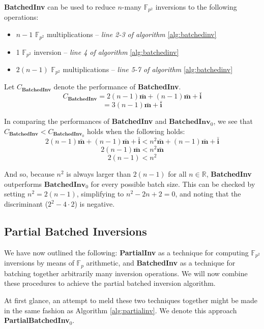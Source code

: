 \textbf{BatchedInv} can be used to reduce $n$-many $\mathbb{F}_{p^{2}}$ inversions to the following operations:

\begin{center}
\begin{itemize}
\item $n-1$ $\mathbb{F}_{p^2}$ multiplications -- \emph{line 2-3 of algorithm} \ref{alg:batchedinv}
\item 1 $\mathbb{F}_{p^2}$ inversion -- \emph{line 4 of algorithm} \ref{alg:batchedinv}
\item $2(n-1)$ $\mathbb{F}_{p^2}$ multiplications -- \emph{line 5-7 of algorithm} \ref{alg:batchedinv}
\end{itemize}
\end{center}

\noindent
Let $C_{\textbf{BatchedInv}}$ denote the performance of \textbf{BatchedInv}.
$$
C_{\textbf{BatchedInv}} = 2(n-1)\bar{\textbf{m}} + (n-1)\bar{\textbf{m}} + \bar{\textbf{i}}
$$
$$
= 3(n-1)\bar{\textbf{m}} + \bar{\textbf{i}}
$$

In comparing the performances of \textbf{BatchedInv} and $\textbf{BatchedInv}_0$, we see that $C_{\textbf{BatchedInv}} < C_{\textbf{BatchedInv}_0}$ holds when the following holds:
$$
2(n-1)\bar{\textbf{m}} + (n-1)\bar{\textbf{m}} + \bar{\textbf{i}} < n^2\bar{\textbf{m}} + (n-1)\bar{\textbf{m}} + \bar{\textbf{i}}
$$
$$
2(n-1)\bar{\textbf{m}} < n^2\bar{\textbf{m}}
$$
$$
2(n-1) < n^2
$$

And so, because $n^2$ is always larger than $2(n-1)$ for all $n \in \mathbb{R}$, \textbf{BatchedInv} outperforms $\textbf{BatchedInv}_0$ for every possible batch size. This can be checked by setting $n^2 = 2(n-1)$, simplifying to $n^2 - 2n + 2 = 0$, and noting that the discriminant ($2^2 - 4\cdot 2$) is negative.

\subsection{Partial Batched Inversions}
\label{subsec:pbi}

We have now outlined the following: \textbf{PartialInv} as a technique for computing $\mathbb{F}_{p^2}$ inversions by means of $\mathbb{F}_{p}$ arithmetic, and \textbf{BatchedInv} as a technique for batching together arbitrarily many inversion operations. We will now combine these procedures to achieve the partial batched inversion algorithm.

At first glance, an attempt to meld these two techniques together might be made in the same fashion as Algorithm \ref{alg:partialinv}. We denote this approach \textbf{PartialBatchedInv}$_0$.


